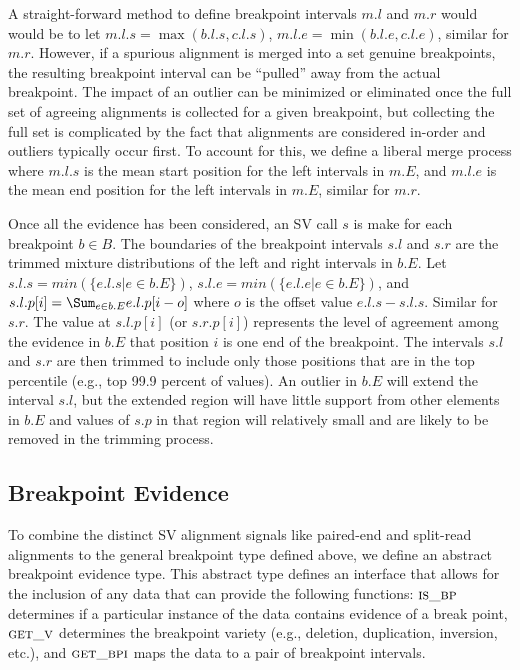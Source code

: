 \documentclass[10pt]{bmc_article}
\newenvironment{bmcformat}{\begin{raggedright}\baselineskip20pt\sloppy\setboolean{publ}{false}}{\end{raggedright}\baselineskip20pt\sloppy}
\begin{document}
\begin{bmcformat}
A straight-forward method to define breakpoint intervals $m.l$ and $m.r$ would
would be to let $m.l.s = \max(b.l.s, c.l.s)$, $m.l.e = \min(b.l.e, c.l.e)$,
similar for $m.r$.  However, if a spurious alignment is merged into a set
genuine breakpoints, the resulting breakpoint interval can be ``pulled'' away
from the actual breakpoint.  The impact of an outlier can be minimized or
eliminated once the full set of agreeing alignments is collected for a given
breakpoint, but collecting the full set is complicated by the fact that
alignments are considered in-order and outliers typically occur first.  To
account for this, we define a liberal merge process where $m.l.s$ is the mean
start position for the left intervals in $m.E$, and  $m.l.e$ is the mean
end position for the left intervals in $m.E$, similar for $m.r$.

Once all the evidence has been considered, an SV call $s$ is make for each
breakpoint $b\in B$.  The boundaries of the breakpoint intervals $s.l$ and $s.r$
are the trimmed mixture distributions of the left and right intervals in $b.E$.
Let $s.l.s=min( \{e.l.s | e\in b.E\})$, $s.l.e=min( \{e.l.e | e\in b.E\})$, and
$s.l.p[i] = \Sum_{e \in b.E} e.l.p[i-o]$ where $o$ is the offset value
$e.l.s-s.l.s$.  Similar for $s.r$.  The value at $s.l.p[i]$ (or $s.r.p[i]$)
represents the level of agreement among the evidence in $b.E$ that position $i$
is one end of the breakpoint.  The intervals $s.l$ and $s.r$ are then trimmed to
include only those positions that are in the top percentile (e.g., top 99.9
percent of values).  An outlier in $b.E$ will extend the interval $s.l$, but the
extended region will have little support from other elements in $b.E$ and values
of $s.p$ in that region will relatively small and are likely to be removed in
the trimming process. 

\subsection*{Breakpoint Evidence}

To combine the distinct SV alignment signals like paired-end and split-read
alignments to the general breakpoint type defined above, we define an
abstract breakpoint evidence type.  This abstract type defines an interface that
allows for the inclusion of any data that can provide the following functions:
$\textsc{is\_bp}$ determines if a particular instance of the data contains
evidence of a break point, $\textsc{get\_v}$ determines the breakpoint variety
(e.g., deletion, duplication, inversion, etc.), and $\textsc{get\_bpi}$
maps the data to a pair of breakpoint intervals.


\end{bmcformat}
\end{document}
